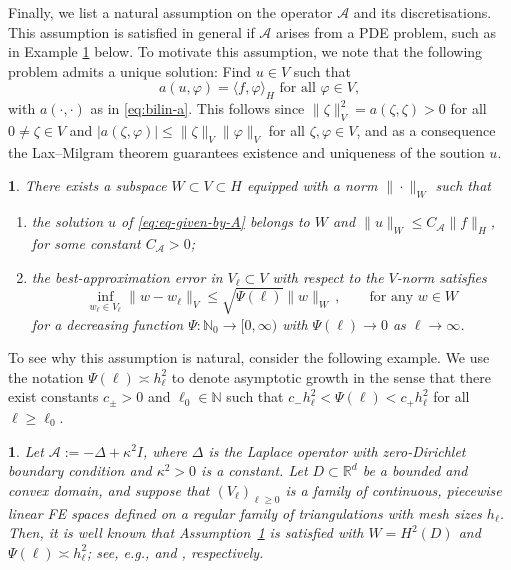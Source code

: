 \documentclass[11pt,english]{article}
\theoremstyle{plain}
\theoremstyle{plain}
\newtheorem{assumption}{\protect\assumptionname}
\theoremstyle{plain}
\theoremstyle{plain}
\newtheorem{example}[thm]{\protect\examplename}
\numberwithin{equation}{section}
\newcommand*{\id}{I}
\newcommand{\jg}[1]{#1}
\providecommand{\assumptionname}{Assumption}
\providecommand{\examplename}{Example}
\begin{document}
Finally, we list a natural assumption on the operator $\mathcal{A}$ and its
discretisations. This assumption is satisfied in general if
$\mathcal{A}$ arises from a PDE problem, such as in Example
\ref{example-Laplace} below. To motivate this assumption, we note that the following problem
admits a unique solution: Find $u\in V$ such that
\begin{equation}
	a(u,\varphi)=\langle f,\varphi\rangle_{H}\text{ for all }\varphi\in V,\label{eq:eq-given-by-A}
\end{equation}
with $a(\cdot,\cdot)$ as in \eqref{eq:bilin-a}. This follows since $\|\zeta\|_{V}^{2}=a(\zeta,\zeta) > 0$ for all $0 \not=\zeta \in V$ and $|a(\zeta,\varphi)|\leq\|\zeta\|_{V}\|\varphi\|_{V}$
for all $\zeta,\varphi\in V$, and as a consequence the Lax--Milgram theorem guarantees existence and uniqueness of the soution $u$.
\begin{assumption}
	\label{assu:WtoH-best-Vell-approx}There exists a subspace 
	$W\subset V \subset H$ equipped with a norm $\|\cdot\|_W$ such that
        \begin{enumerate}
        \item[(a)] the solution $u$ of \eqref{eq:eq-given-by-A}
	belongs to $W$ and $\|u\|_{W}\leq C_{\mathcal{A}}\|f\|_{H}$,
	for some constant $C_{\mathcal{A}}>0$;
        \item[(b)] the best-approximation error in $V_\ell\subset V$ with respect to
        the $V$-norm satisfies
	\[
        \inf_{w_{\ell}\in  V_{\ell}}\|w-w_{\ell}\|_{V}\leq\sqrt{\Psi(\ell)}\|w\|_{W}\,,\qquad\text{for
                  any }w\in W 
        \]
        for a  decreasing function $\Psi\colon\mathbb{N}_{0}\to[0,\infty)$ \jg{with $\Psi(\ell)\rightarrow 0$ as $\ell\rightarrow \infty$}.
              \end{enumerate}
\end{assumption}
To see why this assumption is natural, consider the following example. We use the notation $\Psi(\ell)\asymp h_\ell^2$ to denote asymptotic growth in the sense that there exist constants $c_\pm>0$ and $\ell_0\in\mathbb{N}$ such that $c_- h_\ell^2 < \Psi(\ell) <c_+ h_\ell^2$ for all $\ell \ge \ell_0$.
\begin{example}
	\label{example-Laplace}Let $\mathcal{A}:=-\Delta+\kappa^{2}\id$, where
	$\Delta$ is the Laplace operator with zero-Dirichlet boundary condition
	and $\kappa^{2}>0$ is a constant. 
	Let $D\subset\mathbb{R}^{d}$ be a bounded and convex domain, and suppose that $(V_{\ell})_{\ell
        \ge 0}$ is a family of continuous, piecewise linear FE
        spaces defined on a regular family of triangulations with mesh
        sizes $h_{\ell}$. Then, it is well known that Assumption~\ref{assu:WtoH-best-Vell-approx} %
	is satisfied with $W=H^{2}(D)$ and $\Psi(\ell)\asymp
        h_{\ell}^{2}$; see, e.g., \cite[Theorem
        9.24]{Hackbusch.W_2017_book_elliptic_2nd} and \cite[Theorem
        3.4.2]{Quarteroni.A_Vali_book_1994_NAPDE}, respectively.
\end{example}
\end{document}
